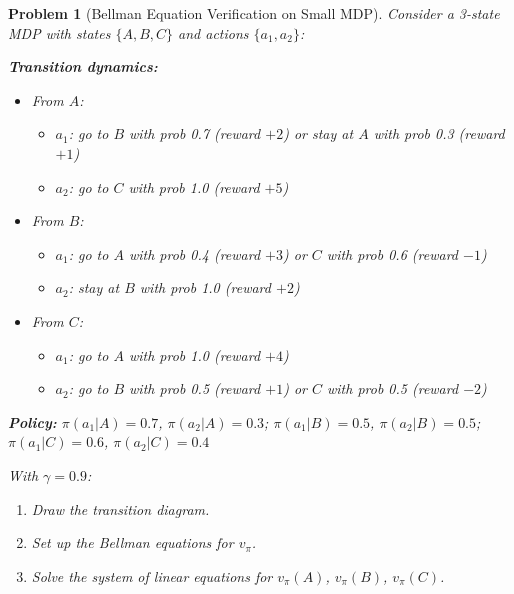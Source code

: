 \documentclass[11pt]{article}
\newtheorem{problem}{Problem}
\theoremstyle{definition}
\begin{document}
\begin{problem}[Bellman Equation Verification on Small MDP]
Consider a 3-state MDP with states $\{A, B, C\}$ and actions $\{a_1, a_2\}$:

\textbf{Transition dynamics:}
\begin{itemize}
    \item From $A$:
    \begin{itemize}
        \item $a_1$: go to $B$ with prob 0.7 (reward $+2$) or stay at $A$ with prob 0.3 (reward $+1$)
        \item $a_2$: go to $C$ with prob 1.0 (reward $+5$)
    \end{itemize}
    \item From $B$:
    \begin{itemize}
        \item $a_1$: go to $A$ with prob 0.4 (reward $+3$) or $C$ with prob 0.6 (reward $-1$)
        \item $a_2$: stay at $B$ with prob 1.0 (reward $+2$)
    \end{itemize}
    \item From $C$:
    \begin{itemize}
        \item $a_1$: go to $A$ with prob 1.0 (reward $+4$)
        \item $a_2$: go to $B$ with prob 0.5 (reward $+1$) or $C$ with prob 0.5 (reward $-2$)
    \end{itemize}
\end{itemize}

\textbf{Policy:} $\pi(a_1|A) = 0.7$, $\pi(a_2|A) = 0.3$; $\pi(a_1|B) = 0.5$, $\pi(a_2|B) = 0.5$; $\pi(a_1|C) = 0.6$, $\pi(a_2|C) = 0.4$

With $\gamma = 0.9$:
\begin{enumerate}[label=(\alph*)]
    \item Draw the transition diagram.
    \item Set up the Bellman equations for $v_\pi$.
    \item Solve the system of linear equations for $v_\pi(A)$, $v_\pi(B)$, $v_\pi(C)$.
\end{enumerate}
\end{problem}
\end{document}

